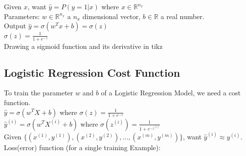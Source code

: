 \documentclass{article}
\begin{document}
    Given $x$, want $\hat{y} = P(y=1 |x)$ where $x \in \mathbb{R}^{n_x}$\\

    Parameters: $w \in \mathbb{R}^{n_x}$ a $n_x$ dimensional vector, $b \in \mathbb{R}$ a real number.\\

    Output $\hat{y} = \sigma(w^{T}x + b) = \sigma(z)$\\

    $\displaystyle \sigma (z)=\frac {1}{1+e^{-z}}$\\

    Drawing a sigmoid function and its derivative in tikz\\

    \pgfplotsset{compat=1.16}


\newpage
\subsection{Logistic Regression Cost Function}

    To train the parameter $w$ and $b$ of a Logistic Regression Model, we need a cost function.\\

    $\hat{y} = \sigma{(w^{T}X + b)}$ where $\sigma(z) = \frac{1}{1+e^{-z}}$\\

    $\hat{y}^{(i)} = \sigma{(w^{T}X^{(i)} + b)}$ where $\sigma(z^{(i)}) = \frac{1}{1+e^{{-z}^{(i)}}}$\\

    Given $\{(x^{(1)}, y^{(1)}), (x^{(2)}, y^{(2)}), \hdots, (x^{(m)}, y^{(m)})\}$, want $\hat{y}^{(i)} \approx y^{(i)}$. \\

    Loss(error) function (for a single training Example):
\end{document}
